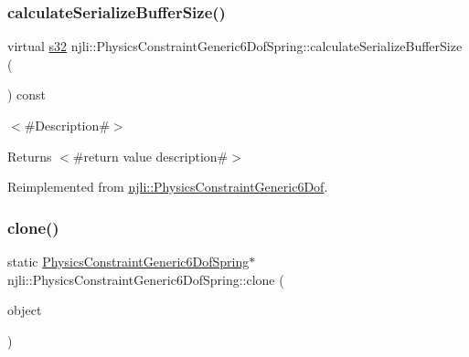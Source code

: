 \mbox{\label{classnjli_1_1_physics_constraint_generic6_dof_spring_a2d22369c72fba1c3a477251c14273a2e}} 
\subsubsection{\texorpdfstring{calculate\+Serialize\+Buffer\+Size()}{calculateSerializeBufferSize()}}
{\footnotesize\ttfamily virtual \mbox{\hyperlink{_util_8h_aa62c75d314a0d1f37f79c4b73b2292e2}{s32}} njli\+::\+Physics\+Constraint\+Generic6\+Dof\+Spring\+::calculate\+Serialize\+Buffer\+Size (\begin{DoxyParamCaption}{ }\end{DoxyParamCaption}) const\hspace{0.3cm}{\ttfamily [virtual]}}

$<$\#\+Description\#$>$

\begin{DoxyReturn}{Returns}
$<$\#return value description\#$>$ 
\end{DoxyReturn}


Reimplemented from \mbox{\hyperlink{classnjli_1_1_physics_constraint_generic6_dof_a386006d689e37b554d43d86d718966d8}{njli\+::\+Physics\+Constraint\+Generic6\+Dof}}.

\mbox{\label{classnjli_1_1_physics_constraint_generic6_dof_spring_a05eb797e000b0e4e1079fa55c3933e3d}} 
\subsubsection{\texorpdfstring{clone()}{clone()}}
{\footnotesize\ttfamily static \mbox{\hyperlink{classnjli_1_1_physics_constraint_generic6_dof_spring}{Physics\+Constraint\+Generic6\+Dof\+Spring}}$\ast$ njli\+::\+Physics\+Constraint\+Generic6\+Dof\+Spring\+::clone (\begin{DoxyParamCaption}\item[{const \mbox{\hyperlink{classnjli_1_1_physics_constraint_generic6_dof_spring}{Physics\+Constraint\+Generic6\+Dof\+Spring}} \&}]{object }\end{DoxyParamCaption})\hspace{0.3cm}{\ttfamily [static]}}

